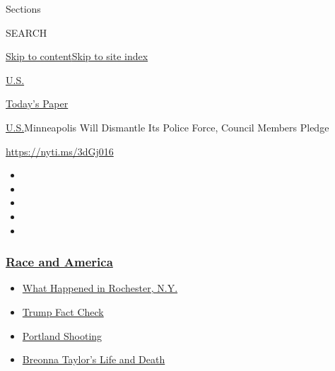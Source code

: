 Sections

SEARCH

\protect\hyperlink{site-content}{Skip to
content}\protect\hyperlink{site-index}{Skip to site index}

\href{https://www.nytimes3xbfgragh.onion/section/us}{U.S.}

\href{https://myaccount.nytimes3xbfgragh.onion/auth/login?response_type=cookie\&client_id=vi}{}

\href{https://www.nytimes3xbfgragh.onion/section/todayspaper}{Today's
Paper}

\href{/section/us}{U.S.}\textbar{}Minneapolis Will Dismantle Its Police
Force, Council Members Pledge

\url{https://nyti.ms/3dGj016}

\begin{itemize}
\item
\item
\item
\item
\item
\end{itemize}

\hypertarget{race-and-america}{%
\subsubsection{\texorpdfstring{\href{https://www.nytimes3xbfgragh.onion/news-event/george-floyd-protests-minneapolis-new-york-los-angeles?name=styln-george-floyd\&region=TOP_BANNER\&block=storyline_menu_recirc\&action=click\&pgtype=Article\&impression_id=20093f60-f294-11ea-bc32-ed4a80477342\&variant=undefined}{Race
and America}}{Race and America}}\label{race-and-america}}

\begin{itemize}
\tightlist
\item
  \href{https://www.nytimes3xbfgragh.onion/2020/09/04/nyregion/rochester-police-daniel-prude.html?name=styln-george-floyd\&region=TOP_BANNER\&block=storyline_menu_recirc\&action=click\&pgtype=Article\&impression_id=20096670-f294-11ea-bc32-ed4a80477342\&variant=undefined}{What
  Happened in Rochester, N.Y.}
\item
  \href{https://www.nytimes3xbfgragh.onion/2020/09/01/us/politics/trump-fact-check-protests.html?name=styln-george-floyd\&region=TOP_BANNER\&block=storyline_menu_recirc\&action=click\&pgtype=Article\&impression_id=20096671-f294-11ea-bc32-ed4a80477342\&variant=undefined}{Trump
  Fact Check}
\item
  \href{https://www.nytimes3xbfgragh.onion/2020/08/30/us/portland-shooting-explained.html?name=styln-george-floyd\&region=TOP_BANNER\&block=storyline_menu_recirc\&action=click\&pgtype=Article\&impression_id=20096672-f294-11ea-bc32-ed4a80477342\&variant=undefined}{Portland
  Shooting}
\item
  \href{https://www.nytimes3xbfgragh.onion/2020/08/30/us/breonna-taylor-police-killing.html?name=styln-george-floyd\&region=TOP_BANNER\&block=storyline_menu_recirc\&action=click\&pgtype=Article\&impression_id=20096673-f294-11ea-bc32-ed4a80477342\&variant=undefined}{Breonna
  Taylor's Life and Death}
\end{itemize}

